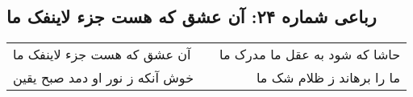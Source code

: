 \begin{center}
\section*{رباعی شماره ۲۴: آن عشق که هست جزء لاینفک ما}
\label{sec:sh024}
\begin{longtable}{l p{0.5cm} r}
آن عشق که هست جزء لاینفک ما
&&
حاشا که شود به عقل ما مدرک ما
\\
خوش آنکه ز نور او دمد صبح یقین
&&
ما را برهاند ز ظلام شک ما
\\
\end{longtable}
\end{center}
